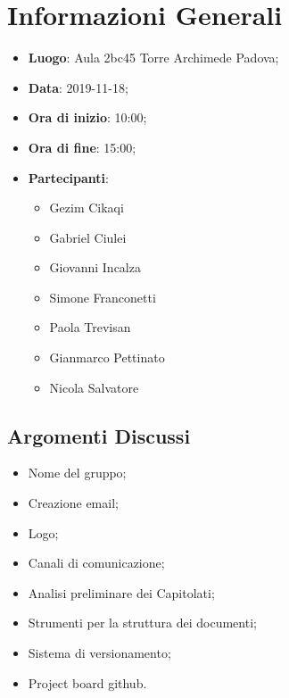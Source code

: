 \section{Informazioni Generali}
	\begin{itemize}
		\item \textbf {Luogo}: Aula 2bc45 Torre Archimede Padova;
		\item \textbf {Data}: 2019-11-18;
		\item \textbf {Ora di inizio}: 10:00;
		\item \textbf {Ora di fine}: 15:00;
		\item \textbf {Partecipanti}: 
			\begin{itemize}
				\item Gezim Cikaqi
				\item Gabriel Ciulei
				\item Giovanni Incalza
				\item Simone Franconetti
				\item Paola Trevisan
				\item Gianmarco Pettinato
				\item Nicola Salvatore
			\end{itemize}
	\end{itemize}
\subsection{Argomenti Discussi}
	\begin{itemize}
		\item Nome del gruppo;
		\item Creazione email;
		\item Logo;
		\item Canali di comunicazione;
		\item Analisi preliminare dei Capitolati\glos;
		\item Strumenti per la struttura dei documenti;
		\item Sistema di versionamento;
		\item Project board github.
	\end{itemize}